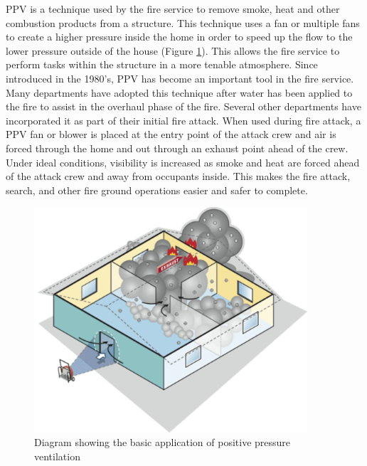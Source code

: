 \documentclass{article}
\begin{document}
PPV is a technique used by the fire service to remove smoke, heat and other combustion products from a structure. This technique uses a fan or multiple fans to create a higher pressure inside the home in order to speed up the flow to the lower pressure outside of the house (Figure \ref{fig:PPV_Diagram}). This allows the fire service to perform tasks within the structure in a more tenable atmosphere. Since introduced in the 1980’s, PPV has become an important tool in the fire service. Many departments have adopted this technique after water has been applied to the fire to assist in the overhaul phase of the fire. Several other departments have incorporated it as part of their initial fire attack. When used during fire attack, a PPV fan or blower is placed at the entry point of the attack crew and air is forced through the home and out through an exhaust point ahead of the crew. Under ideal conditions, visibility is increased as smoke and heat are forced ahead of the attack crew and away from occupants inside. This makes the fire attack, search, and other fire ground operations easier and safer to complete.


\begin{figure}[H]
	\centering
	\includegraphics[width = 4in]{0_Images/Tactical_Considerations/Exhaust_Over_Cone/ppv_illistration.pdf}
	\caption{Diagram showing the basic application of positive pressure ventilation}
	\label{fig:PPV_Diagram}
\end{figure}
 
\end{document}
